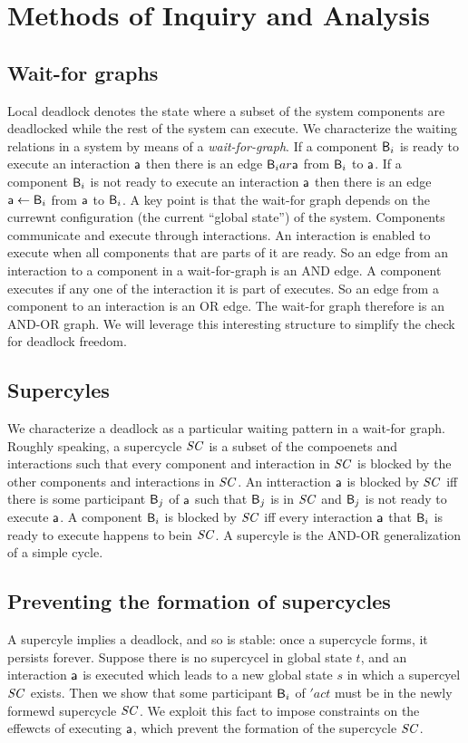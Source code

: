\section{Methods of Inquiry and Analysis}

\subsection{Wait-for graphs}

Local deadlock denotes the state where a subset of the system components are deadlocked while the rest of the system can execute.
%
We characterize the waiting relations in a system by means of a {\em wait-for-graph}. 
If a component $\mathsf{B}_i$ is ready to execute an interaction $\mathsf{a}$ then there is an edge $\mathsf{B}_i ar \mathsf{a}$ from $\mathsf{B}_i$ to $\mathsf{a}$.
If a component $\mathsf{B}_i$ is not ready to execute an interaction $\mathsf{a}$ then there is an edge $\mathsf{a} \leftarrow \mathsf{B}_i$ from $\mathsf{a}$ to $\mathsf{B}_i$.
A key point is that the wait-for graph depends on the currewnt configuration (\ie the current ``global state'') of the system.
%
Components communicate and execute through interactions. 
An interaction is enabled to execute when all components that 
are parts of it are ready. 
So an edge from an interaction to a component in a wait-for-graph
is an AND edge. 
A component executes if any one of the interaction it is part of
executes. So an edge from a component to an interaction is an OR
edge. 
The wait-for graph therefore is an AND-OR graph. 
We will leverage this interesting structure to simplify the
check for deadlock freedom. 



\subsection{Supercyles}

We characterize a deadlock as a particular waiting pattern in a wait-for graph.
Roughly speaking, a supercycle $\mathit{SC}$ is a subset of the compoenets and interactions such that every component and interaction in $\mathit{SC}$ is blocked by
the other components and interactions in $\mathit{SC}$. 
An intteraction $\mathsf{a}$ is blocked by $\mathit{SC}$ iff there is some participant $\mathsf{B}_j$ of $\mathsf{a}$ such that $\mathsf{B}_j$ is in $\mathit{SC}$ and $\mathsf{B}_j$ is not ready to
execute $\mathsf{a}$.
A component $\mathsf{B}_i$ is blocked by $\mathit{SC}$ iff every interaction $\mathsf{a}$ that $\mathsf{B}_i$ is ready to execute happens to bein $\mathit{SC}$.
A supercyle is the AND-OR generalization of a simple cycle.



\subsection{Preventing the formation of supercycles}

A supercyle implies a deadlock, and so is stable: once a supercycle forms, it persists forever.
Suppose there is no supercycel in global state $t$, and an interaction $\mathsf{a}$ is executed which leads to a new global state $s$ in which a supercyel $\mathit{SC}$
exists. 
Then we show that some participant $\mathsf{B}_i$ of $'act$ must be in the newly formewd supercycle $\mathit{SC}$. 
We exploit this fact to impose constraints on the effewcts of executing $\mathsf{a}$, which prevent the formation of the supercycle $\mathit{SC}$.
